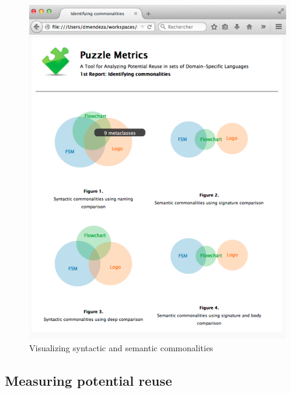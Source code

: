 \begin{figure}
\centering
\includegraphics[width=1\linewidth]{images/domains-inaction.pdf}
\caption{Visualizing syntactic and semantic commonalities}
\label{fig:shape}
\end{figure}


\subsection{Measuring potential reuse}

